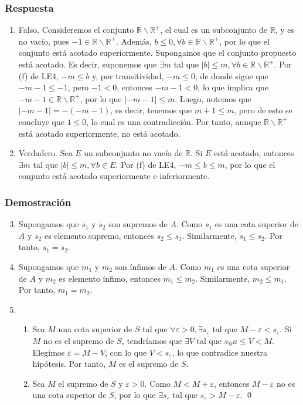 \documentclass[11pt]{article}
\newcommand{\R}{\mathbb{R}}
\let\epsilon\varepsilon
\begin{document}
\subsubsection*{Respuesta}

\begin{enumerate}[label=\arabic*.]
    \item Falso. Consideremos el conjunto $\R\backslash \R^+$, el cual es un subconjunto de $\R$, y es no vacío, pues $-1\in \R\backslash \R^+$. Además, $b\leq 0, \forall b\in \R\backslash\R^+$, por lo que el conjunto está acotado superiormente. Supongamos que el conjunto propuesto está acotado. Es decir, suponemos que $\exists m$ tal que $|b|\leq m, \forall b\in \R\backslash \R^+$. Por (f) de LE4, $-m \leq b$ y, por transitividad, $-m\leq 0$, de donde sigue que $-m-1\leq -1$, pero $-1<0$, entonces $-m-1<0$, lo que implica que $-m-1\in \R\backslash \R^+$, por lo que $|-m-1|\leq m$. Luego, notemos que $|-m-1|=-(-m-1)$, es decir, tenemos que $m+1\leq m$, pero de esto se concluye que $1\leq 0$, lo cual es una contradicción. Por tanto, aunque $\R\backslash \R^+$ está acotado superiormente, no está acotado.
    \item Verdadero. Sea $E$ un subconjunto no vacío de $\R$. Si $E$ está acotado, entonces $\exists m$ tal que $|b|\leq m,\forall b \in E$. Por (f) de LE4, $-m\leq b \leq m$, por lo que el conjunto está acotado superiormente e inferiormente.
\end{enumerate}

\subsubsection*{Demostración}

\begin{enumerate}[label=\arabic*.]\setcounter{enumi}{2}
    \item Supongamos que $s_1$ y $s_2$ son supremos de $A$. Como $s_1$ es una cota superior de $A$ y $s_2$ es elemento supremo, entonces $s_2\leq s_1$. Similarmente, $s_1\leq s_2$. Por tanto, $s_1=s_2$.
    \item Supongamos que $m_1$ y $m_2$ son ínfimos de $A$. Como $m_1$ es una cota superior de $A$ y $m_2$ es elemento ínfimo, entonces $m_1\leq m_2$. Similarmente, $m_2\leq m_1$. Por tanto, $m_1=m_2$.
    \item \begin{enumerate}[label=\roman*)]
        \item Sea $M$ una cota superior de $S$ tal que $\forall \epsilon>0, \exists s_{\epsilon}$ tal que $M-\epsilon<s_{\epsilon}$. Si $M$ no es el supremo de $S$, tendríamos que $\exists V$ tal que $s_@a \leq V < M$. Elegimos $\epsilon = M-V$, con lo que $V<s_{\epsilon}$, lo que contradice nuestra hipótesis. Por tanto, $M$ es el supremo de $S$.
        \item Sea $M$ el supremo de $S$ y $\epsilon>0$. Como $M<M+\epsilon$, entonces $M-\epsilon$ no es una cota superior de $S$, por lo que $\exists s_\epsilon$ tal que $s_\epsilon>M-\epsilon$. \qed
    \end{enumerate}
\end{enumerate}
\end{document}
